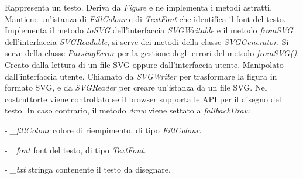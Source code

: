 Rappresenta un testo.
Deriva da \textit{Figure} e ne implementa i metodi astratti. Mantiene un'istanza di \textit{FillColour} e di \textit{TextFont} che identifica il font del testo. Implementa il metodo \textit{toSVG} dell'interfaccia \textit{SVGWritable} e il metodo \textit{fromSVG} dell'interfaccia \textit{SVGReadable}, si serve dei metodi della classe \textit{SVGGenerator}. Si serve della classe \textit{ParsingError} per la gestione degli errori del metodo \textit{fromSVG()}.
Creato dalla lettura di un file SVG oppure dall'interfaccia utente. Manipolato dall'interfaccia utente. Chiamato da \textit{SVGWriter} per trasformare la figura in formato SVG, e da \textit{SVGReader} per creare un'istanza da un file SVG.
Nel costruttorte viene controllato se il browser supporta le API per il disegno del testo. In caso contrario, il metodo \textit{draw} viene settato a \textit{fallbackDraw}.
\begin{elencopuntato}[\subsubsecindent]
\item[-] \textit{{\_}fillColour} colore di riempimento, di tipo \textit{FillColour}.
\item[-] \textit{{\_}font} font del testo, di tipo \textit{TextFont}.
\item[-] \textit{{\_}txt} stringa contenente il testo da disegnare.
\end{elencopuntato}
